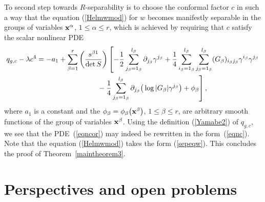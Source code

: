 \documentclass[pdftex]{sigma}
\numberwithin{equation}{section}
\newcommand{\jbeta}{j_{\beta}}
\newcommand{\lbeta}{l_{\beta}}
\newcommand{\ibeta}{i_{\beta}}
\begin{document}
To second step towards $R$-separability is to choose the conformal factor $c$ in such a way that the equation (\ref{Helmwmod}) for $w$ becomes manifestly separable in the groups of variables ${\bf x}^{\alpha}$, $1\leq \alpha \leq r$, which is achieved by requiring that $c$ satisfy the scalar nonlinear PDE
\begin{gather}
q_{g,c}-\lambda c^{4} = -a_1 + \sum_{\beta=1}^{r}\left(\frac{s^{\beta 1}}{\det S}\right)\left[-\frac{1}{2}\sum_{\jbeta = 1_{\beta}}^{\lbeta}\partial_{\jbeta}\gamma^{\jbeta} +\frac{1}{4}\sum_{\ibeta = 1_{\beta}}^{\lbeta}\sum_{\jbeta = 1_{\beta}}^{\lbeta}(G_{\beta})_{\ibeta \jbeta}\gamma^{\ibeta}\gamma^{\jbeta}\right.\nonumber\\
\left. \hphantom{q_{g,c}-\lambda c^{4} =}{} -\frac{1}{4}\sum_{\jbeta =1_{\beta}}^{\lbeta}\partial_{\jbeta}\big(\log|G_{\beta}|\gamma^{\jbeta}\big)+\phi_{\beta}\right],\label{eqncor}
\end{gather}
where $a_1$ is a constant and the $\phi_{\beta}=\phi_{\beta}\big({\bf x}^{\beta}\big)$, $1\leq \beta \leq r$, are arbitrary smooth functions of the group of variables ${\bf x}^{\beta}$. Using the definition (\ref{Yamabe2}) of $q_{g,c}$, we see that the PDE~(\ref{eqncor}) may indeed be rewritten in the form~(\ref{eqnc}). Note that the equation (\ref{Helmwmod}) takes the form (\ref{sepeqw}). This concludes the proof of Theorem~\ref{maintheorem3}.

\section{Perspectives and open problems}\label{Perspectives}
\end{document}
